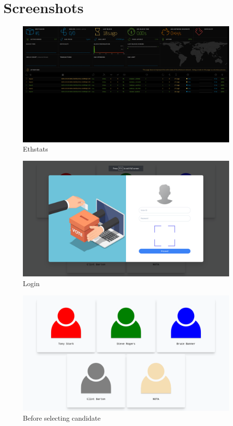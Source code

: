 \documentclass[oneside, 12pt]{book}
\begin{document}
	\section{Screenshots}
	\newpage
		\begin{figure}[H]
			\includegraphics[width=\linewidth]{./Resources/ethstats.png}
		    \caption{Ethstats}
		    \label{fig:ethstats}
		\end{figure}
		\begin{figure}[H]
			\includegraphics[width=\linewidth]{./Resources/login.png}
		    \caption{Login}
		    \label{fig:login}
		\end{figure}
		\begin{figure}[H]
			\includegraphics[width=\linewidth]{./Resources/pre-vote.png}
		    \caption{Before selecting candidate}
		    \label{fig:pre-vote}
		\end{figure}
\end{document}
